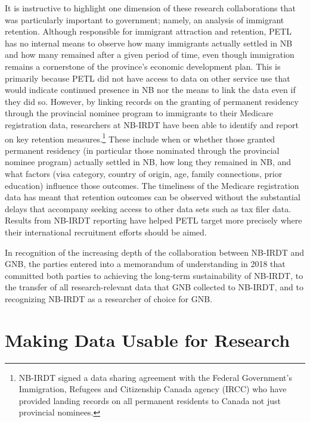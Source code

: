 It is instructive to highlight one dimension of these research collaborations that was particularly important to government; namely, an analysis of immigrant retention. Although responsible for immigrant attraction and retention, PETL has no internal means to observe how many immigrants actually settled in NB and how many remained after a given period of time, even though immigration remains a cornerstone of the province's economic development plan. This is primarily because PETL did not have access to data on other service use that would indicate continued presence in NB nor the means to link the data even if they did so. However, by linking records on the granting of permanent residency through the provincial nominee program to immigrants to their Medicare registration data, researchers at NB-IRDT have been able to identify and report on key retention measures.\footnote{NB-IRDT signed a data sharing agreement with the Federal Government's Immigration, Refugees and Citizenship Canada agency (IRCC) who have provided landing records on all permanent residents to Canada not just provincial nominees.} These include when or whether those granted permanent residency (in particular those nominated through the provincial nominee program) actually settled in NB, how long they remained in NB, and what factors (visa category, country of origin, age, family connections, prior education) influence those outcomes. The timeliness of the Medicare registration data has meant that retention outcomes can be observed without the substantial delays that accompany seeking access to other data sets such as tax filer data. Results from NB-IRDT reporting have helped PETL target more precisely where their international recruitment efforts should be aimed.

In recognition of the increasing depth of the collaboration between NB-IRDT and GNB, the parties entered into a memorandum of understanding in 2018 that committed both parties to achieving the long-term sustainability of NB-IRDT, to the transfer of all research-relevant data that GNB collected to NB-IRDT, and to recognizing NB-IRDT as a researcher of choice for GNB.

\hypertarget{nbirdt-making}{%
\section{Making Data Usable for Research}\label{nbirdt-making}}

